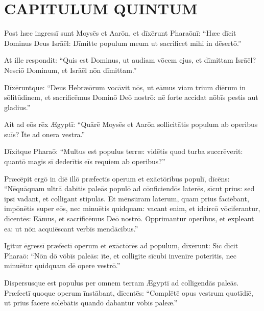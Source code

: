 \chapter{CAPITULUM QUINTUM}

Post hæc ingressī sunt Moysēs et Aarōn,
et dīxērunt Pharaōnī: ``Hæc dīcit Dominus Deus Isrāēl:
Dīmitte populum meum ut sacrificet mihi in dēsertō.''

At ille respondit: ``Quis est Dominus,
ut audiam vōcem ejus, et dīmittam Isrāēl?
Nesciō Dominum, et Isrāēl nōn dīmittam.''

Dīxēruntque: ``Deus Hebræōrum vocāvit nōs,
ut eāmus viam trium diērum in sōlitūdinem,
et sacrificēmus Dominō Deō nostrō:
nē forte accidat nōbīs pestis aut gladius.''

Ait ad eōs rēx Ægyptī: ``Quārē Moysēs et Aarōn sollicitātis populum ab operibus suīs? Īte ad onera vestra.''

Dīxitque Pharaō: ``Multus est populus terræ:
vidētis quod turba succrēverit:
quantō magis sī dederītis eīs requiem ab operibus?''

Præcēpit ergō in diē illō præfectīs operum
et exāctōribus populī, dīcēns: 
``Nēquāquam ultrā dabitis paleās populō ad cōnficiendōs laterēs,
sīcut prius: sed ipsī vadant, et colligant stipulās.
Et mēnsūram laterum, quam prius faciēbant,
impōnētis super eōs, nec minuētis quidquam:
vacant enim, et idcircō vōciferantur, dīcentēs:
Eāmus, et sacrificēmus Deō nostrō.
Opprimantur operibus, et expleant ea:
ut nōn acquiēscant verbīs mendācibus.''

Igitur ēgressī præfectī operum et exāctōrēs ad populum,
dīxērunt: Sīc dīcit Pharaō: ``Nōn dō vōbīs paleās: īte,
et colligite sīcubi invenīre poteritis,
nec minuētur quidquam dē opere vestrō.''

Dispersusque est populus per omnem terram Ægyptī ad colligendās paleās.
Præfectī quoque operum
īnstābant, dīcentēs: ``Complētē opus vestrum quotīdiē,
ut prius facere solēbātis quandō dabantur vōbīs paleæ.''

